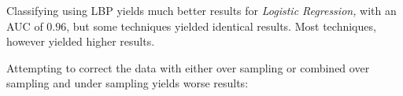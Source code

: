 \documentclass[letterpaper]{report}
\begin{document}

Classifying using LBP yields much better results for \textit{Logistic Regression,} with an AUC of $0.96$, but some techniques yielded identical results. Most techniques, however yielded higher results.
\begin{tiny}
\renewcommand{\arraystretch}{1.2}

\end{tiny}

Attempting to correct the data with either over sampling or combined over sampling and under sampling yields worse results:

%

%
%
%
\end{document}
